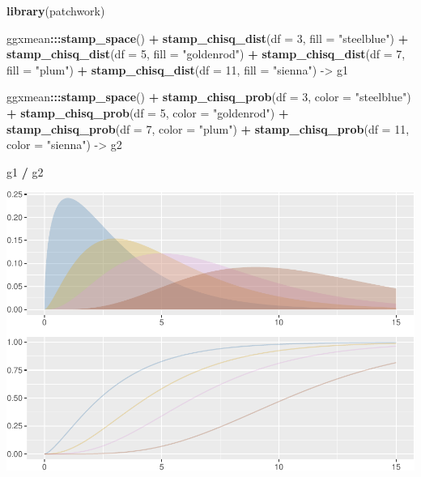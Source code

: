 \documentclass[12pt]{article}
\newenvironment{Shaded}{\begin{snugshade}}{\end{snugshade}}
\newcommand{\DataTypeTok}[1]{\textcolor[rgb]{0.13,0.29,0.53}{#1}}
\newcommand{\DecValTok}[1]{\textcolor[rgb]{0.00,0.00,0.81}{#1}}
\newcommand{\KeywordTok}[1]{\textcolor[rgb]{0.13,0.29,0.53}{\textbf{#1}}}
\newcommand{\NormalTok}[1]{#1}
\newcommand{\OperatorTok}[1]{\textcolor[rgb]{0.81,0.36,0.00}{\textbf{#1}}}
\newcommand{\StringTok}[1]{\textcolor[rgb]{0.31,0.60,0.02}{#1}}
\begin{document}
\begin{Shaded}
\begin{Highlighting}[]
\KeywordTok{library}\NormalTok{(patchwork)}

\NormalTok{ggxmean}\OperatorTok{:::}\KeywordTok{stamp_space}\NormalTok{() }\OperatorTok{+}
\StringTok{  }\KeywordTok{stamp_chisq_dist}\NormalTok{(}\DataTypeTok{df =} \DecValTok{3}\NormalTok{,  }\DataTypeTok{fill =} \StringTok{"steelblue"}\NormalTok{) }\OperatorTok{+}
\StringTok{  }\KeywordTok{stamp_chisq_dist}\NormalTok{(}\DataTypeTok{df =} \DecValTok{5}\NormalTok{,  }\DataTypeTok{fill =} \StringTok{"goldenrod"}\NormalTok{) }\OperatorTok{+}
\StringTok{  }\KeywordTok{stamp_chisq_dist}\NormalTok{(}\DataTypeTok{df =} \DecValTok{7}\NormalTok{,  }\DataTypeTok{fill =} \StringTok{"plum"}\NormalTok{) }\OperatorTok{+}
\StringTok{  }\KeywordTok{stamp_chisq_dist}\NormalTok{(}\DataTypeTok{df =} \DecValTok{11}\NormalTok{, }\DataTypeTok{fill =} \StringTok{"sienna"}\NormalTok{) ->}
\NormalTok{g1}
  
\NormalTok{ggxmean}\OperatorTok{:::}\KeywordTok{stamp_space}\NormalTok{() }\OperatorTok{+}
\StringTok{  }\KeywordTok{stamp_chisq_prob}\NormalTok{(}\DataTypeTok{df =} \DecValTok{3}\NormalTok{,  }\DataTypeTok{color =} \StringTok{"steelblue"}\NormalTok{) }\OperatorTok{+}
\StringTok{  }\KeywordTok{stamp_chisq_prob}\NormalTok{(}\DataTypeTok{df =} \DecValTok{5}\NormalTok{,  }\DataTypeTok{color =} \StringTok{"goldenrod"}\NormalTok{) }\OperatorTok{+}
\StringTok{  }\KeywordTok{stamp_chisq_prob}\NormalTok{(}\DataTypeTok{df =} \DecValTok{7}\NormalTok{,  }\DataTypeTok{color =} \StringTok{"plum"}\NormalTok{) }\OperatorTok{+}
\StringTok{  }\KeywordTok{stamp_chisq_prob}\NormalTok{(}\DataTypeTok{df =} \DecValTok{11}\NormalTok{, }\DataTypeTok{color =} \StringTok{"sienna"}\NormalTok{) ->}
\NormalTok{g2}

\NormalTok{g1 }\OperatorTok{/}\StringTok{ }\NormalTok{g2}
\end{Highlighting}
\end{Shaded}

\begin{center}\includegraphics[width=0.5\linewidth]{manuscript_files/figure-latex/unnamed-chunk-14-1} \end{center}

\citep{tishkovskaya2012statistical}



\end{document}
